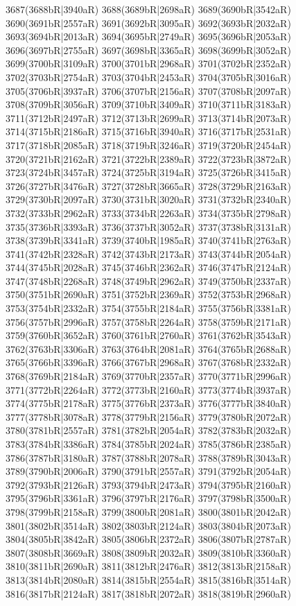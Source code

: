 3687(3688bR|3940aR) 3688(3689bR|2698aR) 3689(3690bR|3542aR) \\3690(3691bR|2557aR) 3691(3692bR|3095aR) 3692(3693bR|2032aR) 3693(3694bR|2013aR) 3694(3695bR|2749aR) 3695(3696bR|2053aR) 3696(3697bR|2755aR) 3697(3698bR|3365aR) 3698(3699bR|3052aR) \\3699(3700bR|3109aR) 3700(3701bR|2968aR) 3701(3702bR|2352aR) 3702(3703bR|2754aR) 3703(3704bR|2453aR) 3704(3705bR|3016aR) 3705(3706bR|3937aR) 3706(3707bR|2156aR) 3707(3708bR|2097aR) \\3708(3709bR|3056aR) 3709(3710bR|3409aR) 3710(3711bR|3183aR) 3711(3712bR|2497aR) 3712(3713bR|2699aR) 3713(3714bR|2073aR) 3714(3715bR|2186aR) 3715(3716bR|3940aR) 3716(3717bR|2531aR) \\3717(3718bR|2085aR) 3718(3719bR|3246aR) 3719(3720bR|2454aR) 3720(3721bR|2162aR) 3721(3722bR|2389aR) 3722(3723bR|3872aR) 3723(3724bR|3457aR) 3724(3725bR|3194aR) 3725(3726bR|3415aR) \\3726(3727bR|3476aR) 3727(3728bR|3665aR) 3728(3729bR|2163aR) 3729(3730bR|2097aR) 3730(3731bR|3020aR) 3731(3732bR|2340aR) 3732(3733bR|2962aR) 3733(3734bR|2263aR) 3734(3735bR|2798aR) \\3735(3736bR|3393aR) 3736(3737bR|3052aR) 3737(3738bR|3131aR) 3738(3739bR|3341aR) 3739(3740bR|1985aR) 3740(3741bR|2763aR) 3741(3742bR|2328aR) 3742(3743bR|2173aR) 3743(3744bR|2054aR) \\3744(3745bR|2028aR) 3745(3746bR|2362aR) 3746(3747bR|2124aR) 3747(3748bR|2268aR) 3748(3749bR|2962aR) 3749(3750bR|2337aR) 3750(3751bR|2690aR) 3751(3752bR|2369aR) 3752(3753bR|2968aR) \\3753(3754bR|2332aR) 3754(3755bR|2184aR) 3755(3756bR|3381aR) 3756(3757bR|2996aR) 3757(3758bR|2264aR) 3758(3759bR|2171aR) 3759(3760bR|3652aR) 3760(3761bR|2760aR) 3761(3762bR|3543aR) \\3762(3763bR|3306aR) 3763(3764bR|2081aR) 3764(3765bR|2688aR) 3765(3766bR|3396aR) 3766(3767bR|2968aR) 3767(3768bR|2332aR) 3768(3769bR|2184aR) 3769(3770bR|2357aR) 3770(3771bR|2996aR) \\3771(3772bR|2264aR) 3772(3773bR|2160aR) 3773(3774bR|3937aR) 3774(3775bR|2178aR) 3775(3776bR|2373aR) 3776(3777bR|3840aR) 3777(3778bR|3078aR) 3778(3779bR|2156aR) 3779(3780bR|2072aR) \\3780(3781bR|2557aR) 3781(3782bR|2054aR) 3782(3783bR|2032aR) 3783(3784bR|3386aR) 3784(3785bR|2024aR) 3785(3786bR|2385aR) 3786(3787bR|3180aR) 3787(3788bR|2078aR) 3788(3789bR|3043aR) \\3789(3790bR|2006aR) 3790(3791bR|2557aR) 3791(3792bR|2054aR) 3792(3793bR|2126aR) 3793(3794bR|2473aR) 3794(3795bR|2160aR) 3795(3796bR|3361aR) 3796(3797bR|2176aR) 3797(3798bR|3500aR) \\3798(3799bR|2158aR) 3799(3800bR|2081aR) 3800(3801bR|2042aR) 3801(3802bR|3514aR) 3802(3803bR|2124aR) 3803(3804bR|2073aR) 3804(3805bR|3842aR) 3805(3806bR|2372aR) 3806(3807bR|2787aR) \\3807(3808bR|3669aR) 3808(3809bR|2032aR) 3809(3810bR|3360aR) 3810(3811bR|2690aR) 3811(3812bR|2476aR) 3812(3813bR|2158aR) 3813(3814bR|2080aR) 3814(3815bR|2554aR) 3815(3816bR|3514aR) \\3816(3817bR|2124aR) 3817(3818bR|2072aR) 3818(3819bR|2960aR) 